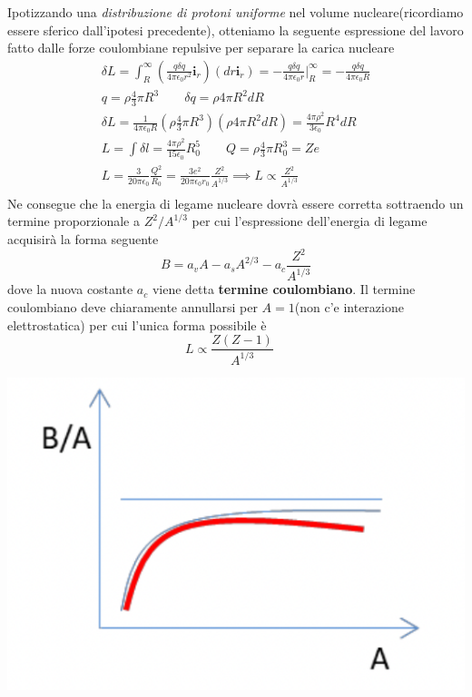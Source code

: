Ipotizzando una \emph{distribuzione di protoni uniforme} nel volume
nucleare(ricordiamo essere sferico dall'ipotesi precedente), otteniamo
la seguente espressione del lavoro fatto dalle forze coulombiane
repulsive per separare la carica nucleare
\begin{gather*}
	\delta L = \int _{R}^{\infty} \left( \frac{q \delta q}{4 \pi \epsilon_{0}r^{2}}  \bm{i}_{r} \right)(dr \bm{i}_{r})=
	- \frac{q \delta q}{4 \pi \epsilon_{0}r} \bigg |_{R}^{\infty} =
	- \frac{q \delta q}{4 \pi \epsilon_{0}R}\\
	q = \rho \frac{ 4}{3} \pi R^{3} \qquad \delta q = \rho 4 \pi R^{2} dR\\
	\delta L = \frac{1}{4 \pi \epsilon_{0}R}\left( \rho \frac{ 4}{3}\pi R^{3} \right)(\rho 4 \pi R^{2} dR) = \frac{4 \pi \rho^{2}}{3 \epsilon_{0}}R^{4}dR\\
	L = \int \delta l = \frac{4 \pi \rho^{2}}{15 \epsilon_{0}}R_{0}^{5} \qquad Q = \rho \frac{ 4}{3} \pi R_{0}^{3} = Ze\\
	L = \frac{3}{20 \pi \epsilon_{0}} \frac{Q^{2}}{R_{0}} = \frac{3e^{2}}{20 \pi \epsilon_{0}r_{0}} \frac{Z^{2}}{A^{1/3}}
	\implies L \propto \frac{ Z^{2}}{A^{1/3}}\\
\end{gather*} Ne consegue che la energia di legame nucleare dovrà essere corretta
sottraendo un termine proporzionale a \(Z^{2} / A^{1/3}\) per cui
l'espressione dell'energia di legame acquisirà la forma seguente \[
	B = a_{v}A - a_{s}A^{2/3} - a_{c} \frac{Z^{2}}{A^{1/3}}
\] dove la nuova costante \(a_{c}\) viene detta \textbf{termine
	coulombiano}.
Il termine coulombiano deve chiaramente annullarsi per
\(A=1\)(non c'e interazione elettrostatica) per cui l'unica forma
possibile è \[
	L \propto \frac{Z(Z-1)}{A^{1/3}} \quad
\]
\begin{marginfigure}
	\includegraphics{figs/goccia3}
	\label{fig:goccia3}
\end{marginfigure}

